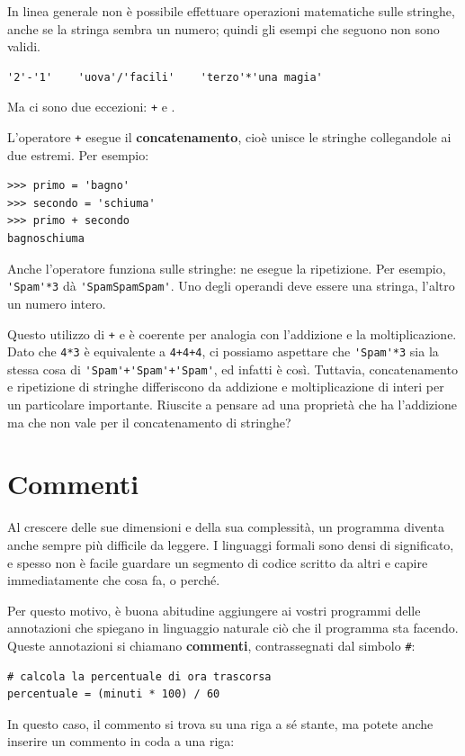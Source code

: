 \documentclass[10pt]{book}
\begin{document}
In linea generale non è possibile effettuare operazioni matematiche sulle stringhe, anche se la stringa sembra un numero; quindi gli esempi che seguono non sono validi.

\begin{verbatim}
'2'-'1'    'uova'/'facili'    'terzo'*'una magia'
\end{verbatim}
%
Ma ci sono due eccezioni: {\tt +} e {\tt *}.

L'operatore {\tt +} esegue il {\bf concatenamento}, cioè unisce le stringhe collegandole ai due estremi. Per esempio:

\begin{verbatim}
>>> primo = 'bagno'
>>> secondo = 'schiuma'
>>> primo + secondo
bagnoschiuma
\end{verbatim}
%

Anche l'operatore {\tt *} funziona sulle stringhe: ne esegue la ripetizione. Per esempio, \verb"'Spam'*3" dà \verb"'SpamSpamSpam'". Uno degli operandi deve essere una stringa, l'altro un numero intero.

Questo utilizzo di {\tt +} e {\tt *} è coerente per analogia con l'addizione e la moltiplicazione. Dato che {\tt 4*3} è equivalente a {\tt 4+4+4}, ci possiamo aspettare che \verb"'Spam'*3" sia la stessa cosa di
\verb"'Spam'+'Spam'+'Spam'", ed infatti è così. Tuttavia, concatenamento e ripetizione di stringhe differiscono da addizione e moltiplicazione di interi per un particolare importante. Riuscite a pensare ad una proprietà che ha l'addizione ma che non vale per il concatenamento di stringhe?


\section{Commenti}

Al crescere delle sue dimensioni e della sua complessità, un programma diventa anche sempre più difficile da leggere. I linguaggi formali sono densi di significato, e spesso non è facile guardare un segmento di codice scritto da altri e capire immediatamente che cosa fa, o perché.

Per questo motivo, è buona abitudine aggiungere ai vostri programmi delle annotazioni che spiegano in linguaggio naturale ciò che il programma sta facendo. Queste annotazioni si chiamano {\bf commenti}, contrassegnati dal simbolo \verb"#":

\begin{verbatim}
# calcola la percentuale di ora trascorsa
percentuale = (minuti * 100) / 60
\end{verbatim}
%
In questo caso, il commento si trova su una riga a sé stante, ma potete anche inserire un commento in coda a una riga:
\end{document}
